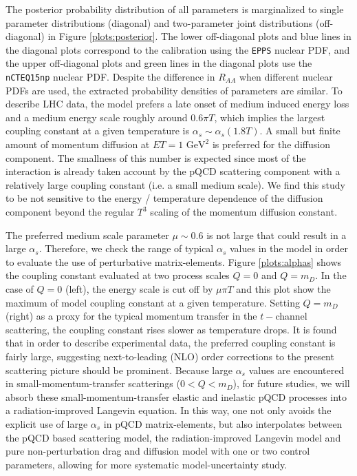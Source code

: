 \documentclass[aps, prc, reprint, amsmath, groupedaddress, nofootinbib]{revtex4-1}
\begin{document}
The posterior probability distribution of all parameters is marginalized to single parameter distributions (diagonal) and two-parameter joint distributions (off-diagonal) in Figure \ref{plots:posterior}.
The lower off-diagonal plots and blue lines in the diagonal plots correspond to the calibration using the {\tt EPPS} nuclear PDF, and the upper off-diagonal plots and green lines in the diagonal plots use the {\tt nCTEQ15np} nuclear PDF.
Despite the difference in $R_{AA}$ when different nuclear PDFs are used, the extracted probability densities of parameters are similar.
To describe LHC data, the model prefers a late onset of medium induced energy loss and a medium energy scale roughly around $0.6\pi T$, which implies the largest coupling constant at a given temperature is $\alpha_s \sim \alpha_s(1.8T)$.
A small but finite amount of momentum diffusion at $ET=1\textrm{ GeV}^2$ is preferred for the diffusion component.
The smallness of this number is expected since most of the interaction is already taken account by the pQCD scattering component with a relatively large coupling constant (i.e. a small medium scale).
We find this study to be not sensitive to the energy / temperature dependence of the diffusion component beyond the regular $T^3$ scaling of the momentum diffusion constant.   

The preferred medium scale parameter $\mu \sim 0.6$ is not large that could result in a large $\alpha_s$.
Therefore, we check the range of typical $\alpha_s$ values in the model in order to evaluate the use of perturbative matrix-elements.
Figure \ref{plots:alphas} shows the coupling constant evaluated at two process scales $Q=0$ and $Q=m_D$.
In the case of $Q=0$ (left), the energy scale is cut off by $\mu\pi T$ and this plot show the maximum of model coupling constant at a given temperature.
Setting $Q=m_D$ (right) as a proxy for the typical momentum transfer in the $t-$channel scattering, the coupling constant rises slower as temperature drops.
It is found that in order to describe experimental data, the preferred coupling constant is fairly large, suggesting next-to-leading (NLO) order corrections to the present scattering picture should be prominent. 
Because large $\alpha_s$ values are encountered in small-momentum-transfer scatterings ($0< Q < m_D$), for future studies, we will absorb these small-momentum-transfer elastic and inelastic pQCD processes into a radiation-improved Langevin equation. 
In this way, one not only avoids the explicit use of large $\alpha_s$ in pQCD matrix-elements, but also interpolates between the pQCD based scattering model, the radiation-improved Langevin model and pure non-perturbation drag and diffusion model with one or two control parameters, allowing for more systematic model-uncertainty study.
\end{document}
